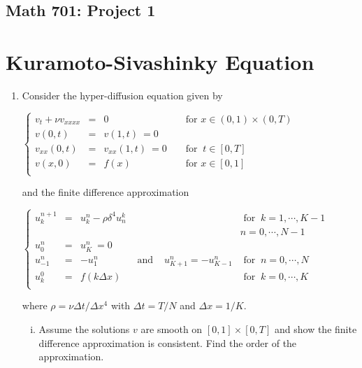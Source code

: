 \documentclass[12pt]{article}
\theoremstyle{definition}
\begin{document}
\begin{center}
\section*{Math 701: Project 1}
\end{center}
\noindent

\section{Kuramoto-Sivashinky Equation}

\begin{enumerate}
\item Consider the hyper-diffusion equation given by
\begin{center}$\left \{\begin{array}{ccccccc}
v_t+ \nu v_{xxxx}&=&0 && \text{ for }  x\in(0,1)\times (0,T)\\
v(0,t)&=&v(1,t)\ =0\\
v_{xx}(0,t)&=&v_{xx}(1,t)\ =0 && \text{ for } \ t\in [0,T]\\
v(x,0)&=&f(x) && \text{ for } x\in[0,1]\\
\end{array}\right.$\end{center}
and the finite difference approximation
\begin{center}$\left \{\begin{array}{ccccccc}
u_k^{n+1}&=&u_k^n-\rho\delta^4u_n^k &&& \text{ for } \ k=1,\cdots,K-1\\
&&&&& n=0,\cdots,N-1\\
u_0^n&=&u_K^n\ =0\\
u_{-1}^n&=& -u_1^n & \text{ and } & u_{K+1}^n=-u_{K-1}^n & \text{ for } \ n=0,\cdots,N\\
u_k^0&=&f(k\Delta x) &&& \text{ for }\ k=0,\cdots,K\\
\end{array}\right.$\end{center}
where $\rho=\nu\Delta t/\Delta x^4$ with $\Delta t=T/N$ and $\Delta x=1/K$.

\begin{enumerate}[(i)]
\item Assume the solutions $v$ are smooth on $[0,1]\times[0,T]$ and show the finite difference approximation is consistent. Find the order of the approximation.


\end{enumerate}
\end{enumerate}
\end{document}
